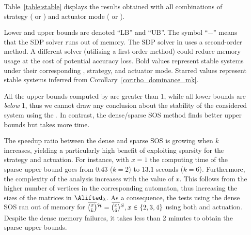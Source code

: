 Table~\ref{table:stable} displays the results obtained with all combinations of strategy (\tK{} or \tS{}) and actuator mode (\tZ{} or \tH{}).

Lower and upper bounds are denoted ``LB'' and ``UB''. 
The symbol ``$-$'' means that the SDP solver runs out of memory.
The SDP solver in  uses a second-order method.
A different solver (utilising a first-order method) could reduce memory usage at the cost of potential accuracy loss.
Bold values represent stable systems under their corresponding \ewhc{}, strategy, and actuator mode.
Starred values represent stable systems inferred from Corollary~\ref{cor:rho_dominance_mk}.

All the upper bounds computed by  are greater than 1, while all lower bounds are \emph{below} 1, thus we cannot draw any conclusion about the stability of the considered system using the .
In contrast, the dense/sparse SOS method finds better upper bounds but takes more time.

The speedup ratio between the dense and sparse SOS is growing when $k$ increases, yielding a particularly high benefit of exploiting sparsity for the \tS{} strategy and \tZ{} actuation.
For instance, with $x=1$ the computing time of the sparse upper bound goes from 0.43 ($k=2$) to 13.1 seconds ($k=6$).
%
Furthermore, the complexity of the analysis increases with the value of $x$.
This follows from the higher number of vertices in the corresponding automaton, thus increasing the sizes of the matrices in $\Alifted_{\lambda}$. 
%
As a consequence, the tests using the dense SOS ran out of memory for $\eanymiss{}{\strat} = \overbar{\binom{x}{6}}^{S}, x \in \left\{ 2, 3, 4 \right\}$ using both \tH{} and \tZ{} actuation.
Despite the dense memory failures, it takes less than 2 minutes to obtain the sparse upper bounds.


